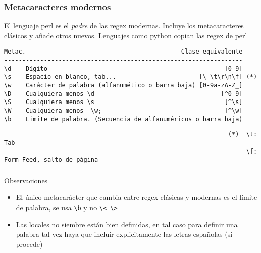 \documentclass[ucs]{beamer}
\begin{document}
\begin{frame}[fragile]
\frametitle{Metacaracteres modernos}
El lenguaje perl es el \emph{padre} de las regex modernas. Incluye
los metacaracteres clásicos y añade otros nuevos. Lenguajes como python copian 
las regex de perl

  \begin{footnotesize}
  \begin{verbatim}
Metac.                                           Clase equivalente
------------------------------------------------------------------
\d    Dígito                                                 [0-9]
\s    Espacio en blanco, tab...                       [\ \t\r\n\f] (*)
\w    Carácter de palabra (alfanumético o barra baja) [0-9a-zA-Z_]
\D    Cualquiera menos \d                                   [^0-9]
\S    Cualquiera menos \s                                    [^\s]
\W    Cualquiera menos  \w;                                  [^\w]
\b    Limite de palabra. (Secuencia de alfanuméricos o barra baja)
  \end{verbatim}
  \end{footnotesize}

\begin{tiny}
\begin{verbatim}
                                                              (*)  \t: Tab
                                                                   \f: Form Feed, salto de página
\end{verbatim}
\end{tiny}
\end{frame}



\begin{frame}[fragile]
\frametitle{}
Observaciones
\begin{itemize}
\item
El único metacarácter que cambia entre regex clásicas
y modernas es el límite de palabra, se usa
\verb|\b| y no \verb|\< \>|

\item
Las locales no siembre están bien definidas, en tal caso
para definir una palabra tal vez haya que incluir explicitamente
las
letras españolas (si procede)

\end{itemize}

\end{frame}
\end{document}
